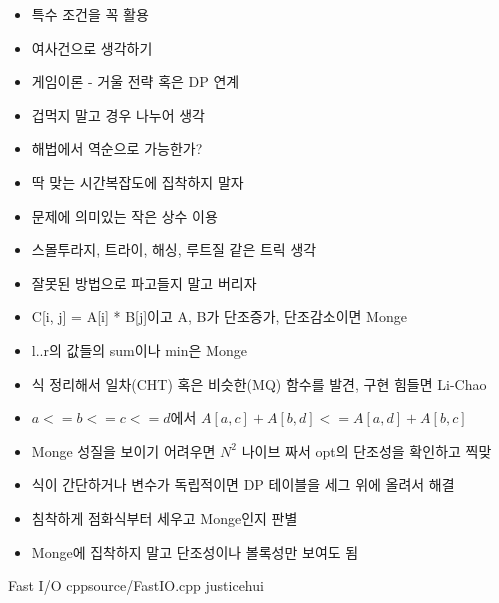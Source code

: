 \documentclass[landscape, 10pt, a4paper, oneside, twocolumn]{extarticle}
\begin{document}
\begin{itemize}
\item 특수 조건을 꼭 활용
\item 여사건으로 생각하기
\item 게임이론 - 거울 전략 혹은 DP 연계
\item 겁먹지 말고 경우 나누어 생각
\item 해법에서 역순으로 가능한가?
\item 딱 맞는 시간복잡도에 집착하지 말자
\item 문제에 의미있는 작은 상수 이용
\item 스몰투라지, 트라이, 해싱, 루트질 같은 트릭 생각
\item 잘못된 방법으로 파고들지 말고 버리자
\end{itemize}

\begin{itemize}
    \item C[i, j] = A[i] * B[j]이고 A, B가 단조증가, 단조감소이면 Monge
    \item l..r의 값들의 sum이나 min은 Monge

    \item 식 정리해서 일차(CHT) 혹은 비슷한(MQ) 함수를 발견, 구현 힘들면 Li-Chao
    \item $a <= b <= c <= d$에서 $A[a,c] + A[b,d] <= A[a,d] + A[b,c]$
    \item Monge 성질을 보이기 어려우면 $N^2$ 나이브 짜서 opt의 단조성을 확인하고 찍맞
    \item 식이 간단하거나 변수가 독립적이면 DP 테이블을 세그 위에 올려서 해결
    \item 침착하게 점화식부터 세우고 Monge인지 판별
    \item Monge에 집착하지 말고 단조성이나 볼록성만 보여도 됨
\end{itemize}

\Algorithm
{Fast I/O}
{}
{}
{cpp}{source/FastIO.cpp}
{justicehui}
\end{document}
